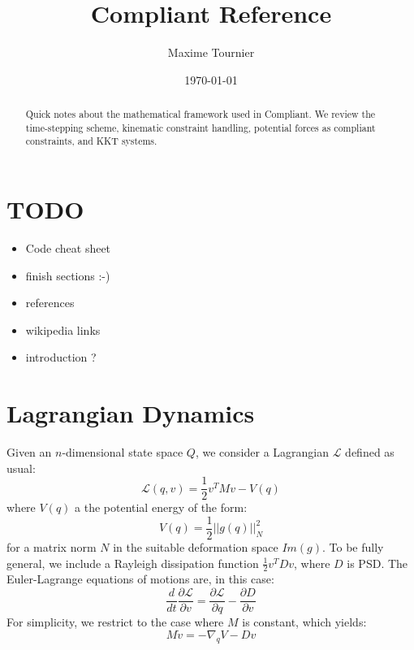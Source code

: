 \documentclass{article}
\newcommand{\LL}{\mathcal{L}}
\newcommand{\half}{\frac{1}{2}}
\newcommand{\norm}[1]{\left|\left|#1\right|\right|}
\newcommand{\ddd}[2]{\frac{\partial #1}{\partial #2}}
\begin{document}
\title{Compliant Reference}
\author{Maxime Tournier}
\date{\today}
\maketitle
%
\begin{abstract}
  Quick notes about the mathematical framework used in Compliant. We
  review the time-stepping scheme, kinematic constraint handling,
  potential forces as compliant constraints, and KKT systems.
\end{abstract}
%
\section*{TODO}
\begin{itemize}
  \item Code cheat sheet
  \item finish sections :-)
  \item references
  \item wikipedia links
  \item introduction ?
\end{itemize}

\section{Lagrangian Dynamics}
Given an $n$-dimensional state space $Q$, we consider a Lagrangian
$\LL$ defined as usual:
%
\begin{equation}
\LL(q, v) = \half v^TMv - V(q)
\end{equation}
%
where $V(q)$ a the potential energy of the form:
%
\begin{equation}
V(q) = \half \norm{g(q)}_N^2
\end{equation}
%
for a matrix norm $N$ in the suitable deformation space $Im(g)$. To be
fully general, we include a Rayleigh dissipation function $\half
v^TDv$, where $D$ is PSD. The Euler-Lagrange equations of motions are,
in this case:
%
\begin{equation}
 \frac{d}{dt}\ddd{\LL}{v} = \ddd{\LL}{q} - \ddd{D}{v} 
\end{equation}
%
For simplicity, we restrict to the case where $M$ is constant, which
yields:
%
\begin{equation}
  \label{eq:dynamics}
  M \dot{v} = -\nabla_q V - D v
\end{equation}
%
\end{document}
